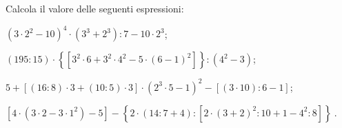 \begin{esercizio}[\Ast]
 Calcola il valore delle seguenti espressioni:
 \begin{enumeratea}
 \item $\left(3\cdot2^2-10\right)^4\cdot\left(3^3+2^3\right):7-10\cdot2^3$;
 \item $(195:15)\cdot\left\lbrace \left[3^2\cdot6+3^2\cdot4^2-5\cdot(6-1)^2 \right]\right\rbrace:\left(4^2-3\right)$;
 \item $5+[(16:8)\cdot3+(10:5)\cdot3 ]\cdot\left(2^3\cdot5-1\right)^2-[(3\cdot10):6-1]$;
 \item $\left[4\cdot\left(3\cdot2-3\cdot1^2\right)-5\right]-\left\lbrace 2\cdot(14:7+4):\left[2\cdot(3+2)^2:10+1-4^2:8\right]\right\rbrace~$.
 \end{enumeratea}
\end{esercizio}
